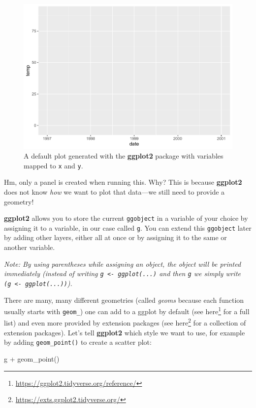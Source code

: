\documentclass[
]{krantz}
\makeatletter
\newenvironment{Shaded}{\begin{snugshade}}{\end{snugshade}}
\newcommand{\FunctionTok}[1]{\textcolor[rgb]{0,0,0}{#1}}
\newcommand{\NormalTok}[1]{#1}
\newcommand{\SpecialCharTok}[1]{\textcolor[rgb]{0,0,0}{#1}}
\renewcommand{\href}[2]{#2\footnote{\url{#1}}}
\newenvironment{kframe}{%
\medskip{}
\setlength{\fboxsep}{.8em}
 \def\at@end@of@kframe{}%
 \ifinner\ifhmode%
  \def\at@end@of@kframe{\end{minipage}}%
  \begin{minipage}{\columnwidth}%
 \fi\fi%
 \def\FrameCommand##1{\hskip\@totalleftmargin \hskip-\fboxsep
 \colorbox{shadecolor}{##1}\hskip-\fboxsep
     \hskip-\linewidth \hskip-\@totalleftmargin \hskip\columnwidth}%
 \MakeFramed {\advance\hsize-\width
   \@totalleftmargin\z@ \linewidth\hsize
   \@setminipage}}%
 {\par\unskip\endMakeFramed%
 \at@end@of@kframe}
\renewenvironment{Shaded}{\begin{kframe}}{\end{kframe}}
\makeatother
\begin{document}
\begin{figure}
\centering
\includegraphics{bookdown_files/figure-latex/ggplot-1.pdf}
\caption{\label{fig:ggplot}A default plot generated with the \textbf{ggplot2} package with variables mapped to \texttt{x} and \texttt{y}.}
\end{figure}

Hm, only a panel is created when running this. Why? This is because \textbf{ggplot2} does not know \emph{how} we want to plot that data---we still need to provide a geometry!

\textbf{ggplot2} allows you to store the current \texttt{ggobject} in a variable of your choice by assigning it to a variable, in our case called \texttt{g}. You can extend this \texttt{ggobject} later by adding other layers, either all at once or by assigning it to the same or another variable.

\emph{Note: By using parentheses while assigning an object, the object will be printed immediately (instead of writing \texttt{g\ \textless{}-\ ggplot(...)} and then \texttt{g} we simply write \texttt{(g\ \textless{}-\ ggplot(...))}).}

There are many, many different geometries (called \emph{geoms} because each function usually starts with \texttt{geom\_}) one can add to a ggplot by default (see \href{https://ggplot2.tidyverse.org/reference/}{here} for a full list) and even more provided by extension packages (see \href{https://exts.ggplot2.tidyverse.org/}{here} for a collection of extension packages). Let's tell \textbf{ggplot2} which style we want to use, for example by adding \texttt{geom\_point()} to create a scatter plot:

\begin{Shaded}
\begin{Highlighting}[]
\NormalTok{g }\SpecialCharTok{+} \FunctionTok{geom\_point}\NormalTok{()}
\end{Highlighting}
\end{Shaded}
\end{document}
